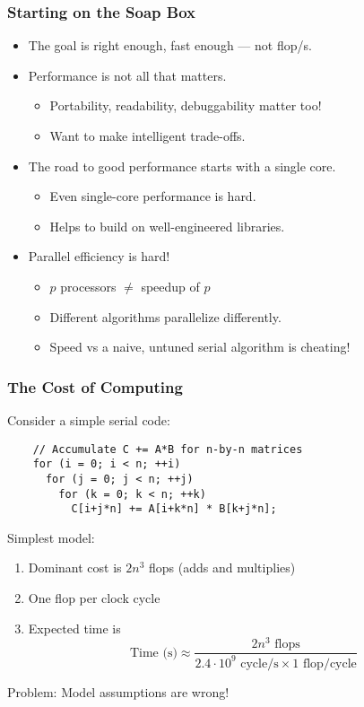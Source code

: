 \documentclass{beamer}
\begin{document}
\begin{frame}
  \titlepage
\end{frame}


\begin{frame}
  \frametitle{Starting on the Soap Box}

  \begin{itemize}
  \item The goal is right enough, fast enough --- not flop/s.
  \item Performance is not all that matters.
    \begin{itemize}
    \item Portability, readability, debuggability matter too!
    \item Want to make intelligent trade-offs.
    \end{itemize}
  \item The road to good performance starts with a single core.
    \begin{itemize}
    \item Even single-core performance is hard.
    \item Helps to build on well-engineered libraries.
    \end{itemize}
  \item Parallel efficiency is hard!
    \begin{itemize}
    \item $p$ processors $\neq$ speedup of $p$
    \item Different algorithms parallelize differently.
    \item Speed vs a naive, untuned serial algorithm is cheating!
    \end{itemize}
  \end{itemize}
\end{frame}


\begin{frame}[fragile]
  \frametitle{The Cost of Computing}

  Consider a simple serial code:
  \begin{lstlisting}
    // Accumulate C += A*B for n-by-n matrices
    for (i = 0; i < n; ++i)
      for (j = 0; j < n; ++j)
        for (k = 0; k < n; ++k)
          C[i+j*n] += A[i+k*n] * B[k+j*n];
  \end{lstlisting}
  Simplest model:
  \begin{enumerate}
  \item Dominant cost is $2n^3$ flops (adds and multiplies)
  \item One flop per clock cycle
  \item Expected time is
    \[
    \mbox{Time (s)} \approx
    \frac{2n^3 \mbox{ flops}}
         {2.4 \cdot 10^9 \mbox{ cycle/s} \times 1 \mbox{ flop/cycle}}
    \]
  \end{enumerate}
  Problem: Model assumptions are wrong!
\end{frame}
\end{document}
